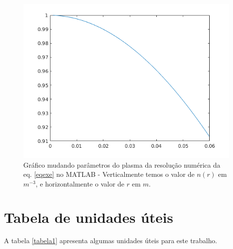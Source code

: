 \documentclass[12pt,oneside,a4paper]{abntex2}
\begin{document}
\begin{figure}[H]
\centering
\includegraphics[scale=0.5]{exeplo2.png} 
\caption{Gráfico mudando parâmetros do plasma da resolução numérica da eq. \ref{eqexe} no MATLAB - Verticalmente temos o valor de $n(r)$ em $m^{-3}$, e horizontalmente o valor de $r$ em $m$.}
\end{figure}


\chapter{Tabela de unidades úteis}
\noindent A tabela \ref{tabela1} apresenta algumas unidades úteis para este trabalho.
    
\end{document}
